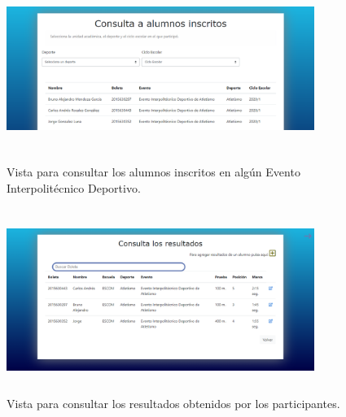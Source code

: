 		\begin{figure} [hbt!]
			\centering
			\includegraphics[width=10cm, height=6cm]{Imagenes/Vistas/Vista18_ConsultaInscritos}
			\caption{Vista para consultar los alumnos inscritos en algún Evento Interpolitécnico Deportivo.}
			\label{VistaConsultaInscritos}
		\end{figure}
		
		\begin{figure} [hbt!]
			\centering
			\includegraphics[width=10cm, height=6cm]{Imagenes/Vistas/Vista19_ConsultaResultados}
			\caption{Vista para consultar los resultados obtenidos por los participantes.}
			\label{VistaConsultaResultados}
		\end{figure}
		
		
